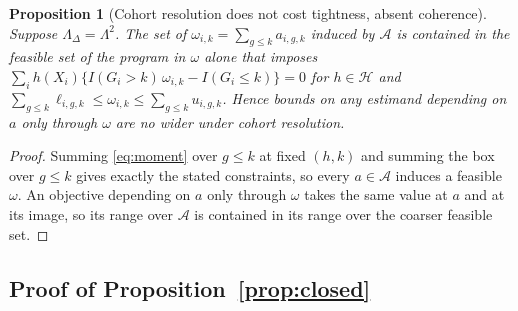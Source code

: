 \documentclass[12pt]{article}
\newtheorem{proposition}{Proposition}
\theoremstyle{remark}
\begin{document}
\begin{proposition}[Cohort resolution does not cost tightness, absent coherence]
\label{prop:cohort}
Suppose $\Lambda_\Delta = \Lambda^2$. The set of $\omega_{i,k} = \sum_{g \le k} a_{i,g,k}$
induced by $\mathcal{A}$ is contained in the feasible set of the program in $\omega$ alone
that imposes $\sum_i h(X_i)\{I(G_i{>}k)\,\omega_{i,k} - I(G_i \le k)\} = 0$ for
$h \in \mathcal{H}$ and $\sum_{g \le k}\ell_{i,g,k} \le \omega_{i,k} \le
\sum_{g \le k} u_{i,g,k}$. Hence bounds on any estimand depending on $a$ only through
$\omega$ are no wider under cohort resolution.
\end{proposition}

\begin{proof}
Summing \eqref{eq:moment} over $g \le k$ at fixed $(h,k)$ and summing the box over
$g \le k$ gives exactly the stated constraints, so every $a \in \mathcal{A}$ induces a
feasible $\omega$. An objective depending on $a$ only through $\omega$ takes the same
value at $a$ and at its image, so its range over $\mathcal{A}$ is contained in its range
over the coarser feasible set.
\end{proof}

\subsection{Proof of Proposition~\ref{prop:closed}}
\end{document}
